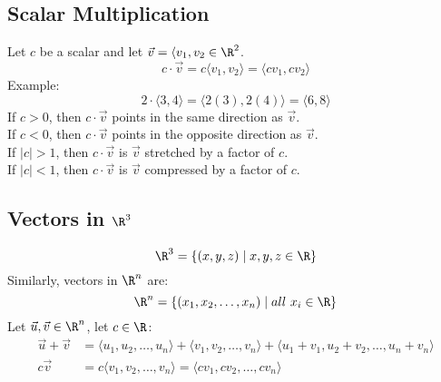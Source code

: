 \documentclass[letterpaper, 12pt]{math}
\begin{document}
\subsection*{Scalar Multiplication}
Let \( c \) be a scalar and let \( \vec{v} = \langle v_1,v_2\in\R^2 \).
\[ c\cdot\vec{v} = c\langle v_1,v_2\rangle = \langle cv_1,cv_2\rangle \]
Example:
\[ 2\cdot\langle3,4\rangle = \langle2(3),2(4)\rangle = \langle6,8\rangle \]
If \( c>0 \), then \( c\cdot\vec{v} \) points in the same direction as
\( \vec{v} \). \\
If \( c<0 \), then \( c\cdot\vec{v} \) points in the opposite
direction as \( \vec{v} \). \\
If \( |c|>1 \), then \( c\cdot\vec{v} \) is \( \vec{v} \) stretched by a factor
of \( c \). \\
If \( |c|<1 \), then \( c\cdot\vec{v} \) is \( \vec{v} \) compressed by a factor
of \( c \).

\subsection*{Vectors in \( \R^3 \)}
\[ \R^3 = \{(x,y,z)\mid x,y,z\in\R\} \]
Similarly, vectors in \( \R^n \) are:
\[ \R^n = \{(x_1,x_2,\dots,x_n)\mid all\ x_i\in\R\} \]
Let \( \vec{u},\vec{v}\in\R^n \), let \( c\in\R \):
\begin{align*}
  \vec{u}+\vec{v} &= \langle u_1,u_2,\dots,u_n\rangle +
    \langle v_1,v_2,\dots,v_n\rangle +
    \langle u_1+v_1,u_2+v_2,\dots,u_n+v_n\rangle \\
  c\vec{v} &= c\langle v_1,v_2,\dots,v_n\rangle =
    \langle cv_1,cv_2,\dots,cv_n\rangle
\end{align*}
\end{document}
